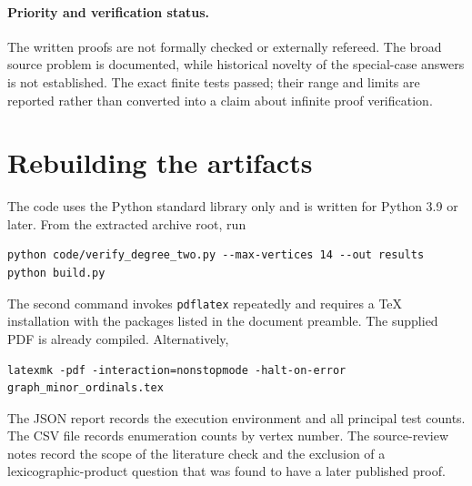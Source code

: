 \documentclass[11pt,letterpaper]{article}
\theoremstyle{plain}
\theoremstyle{definition}
\theoremstyle{remark}
\begin{document}
\paragraph{Priority and verification status.}
The written proofs are not formally checked or externally refereed.
The broad source problem is documented, while historical novelty of
the special-case answers is not established. The exact finite tests
passed; their range and limits are reported rather than converted
into a claim about infinite proof verification.

\clearpage
\section{Rebuilding the artifacts}

The code uses the Python standard library only and is written for
Python 3.9 or later. From the extracted archive root, run
\begin{lstlisting}
python code/verify_degree_two.py --max-vertices 14 --out results
python build.py
\end{lstlisting}
The second command invokes \texttt{pdflatex} repeatedly and requires
a TeX installation with the packages listed in the document
preamble. The supplied PDF is already compiled. Alternatively,
\begin{lstlisting}
latexmk -pdf -interaction=nonstopmode -halt-on-error graph_minor_ordinals.tex
\end{lstlisting}
The JSON report records the execution environment and all principal
test counts. The CSV file records enumeration counts by vertex
number. The source-review notes record the scope of the literature
check and the exclusion of a lexicographic-product question that
was found to have a later published proof.
\end{document}
